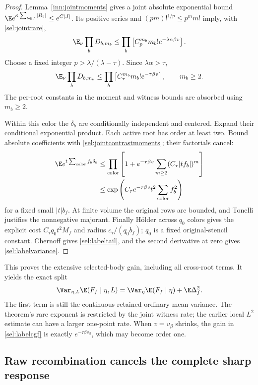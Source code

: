 \begin{proof}
Lemma~\ref{inn:jointmoments} gives a joint absolute exponential bound \(\E e^{\kappa\sum_{b\in J}|R_b|}\le e^{C|J|}\). Its positive series and \((pm)!^{1/p}\le p^m m!\) imply, with \eqref{sel:jointrare},
\[
 \E_\nu\prod_bD_{b,m_b}
 \le\prod_b\left[C_p^{m_b}m_b!e^{-\lambda\alpha\beta v}\right].
\]
Choose a fixed integer \(p>\lambda/(\lambda-\tau)\). Since \(\lambda\alpha>\tau\),
\begin{equation}
 \E_\nu\prod_bD_{b,m_b}
 \le\prod_b\left[C_\tau^{m_b}m_b!e^{-\tau\beta v}\right],
 \qquad m_b\ge2.
 \label{sel:jointcontrastmoments}
\end{equation}
The per-root constants in the moment and witness bounds are absorbed using \(m_b\ge2\).

Within this color the \(\delta_b\) are conditionally independent and centered. Expand their conditional exponential product. Each active root has order at least two. Bound absolute coefficients with \eqref{sel:jointcontrastmoments}; their factorials cancel:
\begin{align*}
 \E e^{t\sum_{\text{color}}f_b\delta_b}
 &\le\prod_{\text{color}}
       \left[1+e^{-\tau\beta v}
                  \sum_{m\ge2}(C_\tau|tf_b|)^m\right]\\
 &\le\exp\left(C_\tau e^{-\tau\beta v}t^2
                       \sum_{\text{color}}f_b^2\right)
\end{align*}
for a fixed small \(|t|b_f\). At finite volume the original rows are bounded, and Tonelli justifies the nonnegative majorant. Finally Hölder across \(q_0\) colors gives the explicit cost \(C_\tau q_0t^2M_f\) and radius \(c_\tau/(q_0b_f)\); \(q_0\) is a fixed original-stencil constant. Chernoff gives \eqref{sel:labeltail}, and the second derivative at zero gives \eqref{sel:labelvariance}.
\end{proof}

This proves the extensive selected-body gain, including all cross-root terms. It yields the exact split
\begin{equation}
 \Var_{\eta,L}\E(F_f\mid\eta,L)
 =\Var_\eta\E(F_f\mid\eta)+\E\Delta_f^2.
 \label{sel:split}
\end{equation}
The first term is still the continuous retained ordinary mean variance. The theorem's rare exponent is restricted by the joint witness rate; the earlier local \(L^2\) estimate can have a larger one-point rate. When \(v=v_\beta\) shrinks, the gain in \eqref{sel:labelcgf} is exactly \(e^{-\tau\beta v_\beta}\), which may become order one.

\subsection{Raw recombination cancels the complete sharp response}

